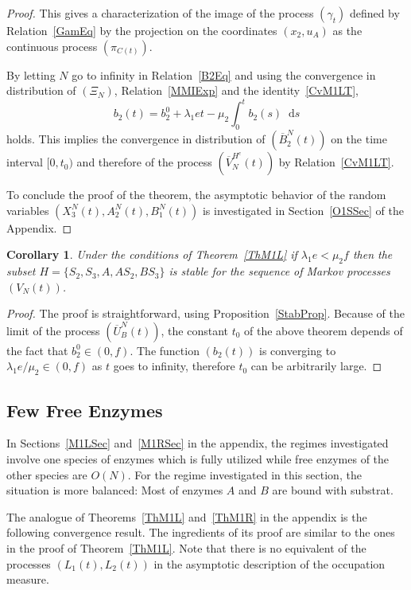 \documentclass[english]{amsart}
\newcommand{\diff}{\mathop{}\mathopen{}\mathrm{d}}
\newtheorem{corollary}[proposition]{Corollary}
\numberwithin{proposition}{section}
\begin{document}
\begin{proof}
This gives a characterization of the image of the process $(\gamma_t)$ defined by Relation~\eqref{GamEq}  by the projection on the coordinates $(x_2, u_A)$ as the continuous process $(\pi_{C(t)})$. 

By letting $N$ go to infinity in Relation~\eqref{B2Eq} and using the convergence in distribution of $(\Xi_N)$, Relation~\eqref{MMIExp} and the identity~\eqref{CvM1LT},
\[
b_2(t)=b_2^0+\lambda_1e t-\mu_2\int_0^t b_2(s)\diff s
\]
holds. This implies the convergence in distribution of $(\overline{B}_2^N(t))$  on the time interval $[0,t_0)$ and therefore of the process $(\overline{V}_N^{H^c}(t))$ by Relation~\eqref{CvM1LT}.
  
To conclude the proof of the theorem, the asymptotic behavior of the random variables  $(X_3^N(t),A_2^N(t),B_1^N(t))$ is investigated in Section~\ref{O1SSec} of the Appendix. 
\end{proof}
\begin{corollary}
Under the conditions of Theorem~\ref{ThM1L} if $\lambda_1e{<}\mu_2 f$ then the subset $H{=}\{{ S}_2,{ S}_3, { A},  { AS_2}, { BS_3}\}$ is stable for the sequence of Markov processes $(V_N(t))$. 
\end{corollary}
\begin{proof}
The proof is straightforward, using Proposition~\ref{StabProp}. Because of the limit of the process $(\overline{U}_B^N(t))$, the constant $t_0$ of the above theorem depends of the fact that $b_2^0{\in}(0,f)$. The function $(b_2(t))$ is converging to $\lambda_1 e/\mu_2{\in}(0,f)$ as $t$ goes to infinity, therefore $t_0$ can be arbitrarily large. 
\end{proof}
\subsection{Few Free Enzymes}\label{M1MSec}

In Sections~\ref{M1LSec} and~\ref{M1RSec} in the appendix, the regimes investigated involve one species of enzymes which is fully utilized while free enzymes of the other species are $O(N)$. For the regime investigated in this section, the situation is more balanced: Most of enzymes ${ A}$ and ${ B}$ are bound with substrat.

The analogue of Theorems~\ref{ThM1L} and~\ref{ThM1R} in the appendix  is the following convergence result. The ingredients of its proof are similar  to the ones in the proof of Theorem~\ref{ThM1L}. Note that there is no equivalent of the processes $(L_1(t),L_2(t))$ in the asymptotic  description of the occupation measure. 
\end{document}
